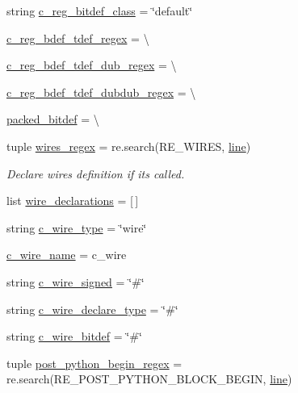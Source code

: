 \begin{DoxyCompactItemize}
\item 
string \hyperlink{namespaceveripy_af15cb34afe7b4fe3faef8366db34a0a7}{c\-\_\-reg\-\_\-bitdef\-\_\-class} = \char`\"{}default\char`\"{}
\item 
\hyperlink{namespaceveripy_a4f676e8fb961627ab4608279f315bf91}{c\-\_\-reg\-\_\-bdef\-\_\-tdef\-\_\-regex} = \textbackslash{}
\item 
\hyperlink{namespaceveripy_a6ed1b232cf9fe15b7d975bb69a7c3ff1}{c\-\_\-reg\-\_\-bdef\-\_\-tdef\-\_\-dub\-\_\-regex} = \textbackslash{}
\item 
\hyperlink{namespaceveripy_a77d24d587b4bdcae0ae2a67c8bcf5849}{c\-\_\-reg\-\_\-bdef\-\_\-tdef\-\_\-dubdub\-\_\-regex} = \textbackslash{}
\item 
\hyperlink{namespaceveripy_a9f51ca42dc7f2f54aba501a90f9d804f}{packed\-\_\-bitdef} = \textbackslash{}
\item 
tuple \hyperlink{namespaceveripy_a7f5cee93cf9ba15ed101dff1c5c85a2b}{wires\-\_\-regex} = re.\-search(R\-E\-\_\-\-W\-I\-R\-E\-S, \hyperlink{namespaceveripy_a3cf9cf94513841f0d65d3081b08a55cc}{line})
\begin{DoxyCompactList}\small\item\em Declare wires definition if its called. \end{DoxyCompactList}\item 
list \hyperlink{namespaceveripy_a1bf7781cecfa001f9a1c00ad44cb8f59}{wire\-\_\-declarations} = \mbox{[}$\,$\mbox{]}
\item 
string \hyperlink{namespaceveripy_a2f7c80ddc952aaaf80ea6413c4d397d5}{c\-\_\-wire\-\_\-type} = \char`\"{}wire\char`\"{}
\item 
\hyperlink{namespaceveripy_a7a0ef7d57ddc5b071192307405e285a8}{c\-\_\-wire\-\_\-name} = c\-\_\-wire
\item 
string \hyperlink{namespaceveripy_ad604c034cbcf22f36b69ac71bc8d0706}{c\-\_\-wire\-\_\-signed} = \char`\"{}\#\char`\"{}
\item 
string \hyperlink{namespaceveripy_ad71d972cd14cafa486e30a6fea57dd35}{c\-\_\-wire\-\_\-declare\-\_\-type} = \char`\"{}\#\char`\"{}
\item 
string \hyperlink{namespaceveripy_a377a5b0657c1d4221cb91341adfdfe0e}{c\-\_\-wire\-\_\-bitdef} = \char`\"{}\#\char`\"{}
\item 
tuple \hyperlink{namespaceveripy_a182e7c6ae2aef981c047222e8d1c879a}{post\-\_\-python\-\_\-begin\-\_\-regex} = re.\-search(R\-E\-\_\-\-P\-O\-S\-T\-\_\-\-P\-Y\-T\-H\-O\-N\-\_\-\-B\-L\-O\-C\-K\-\_\-\-B\-E\-G\-I\-N, \hyperlink{namespaceveripy_a3cf9cf94513841f0d65d3081b08a55cc}{line})

\end{DoxyCompactItemize}

